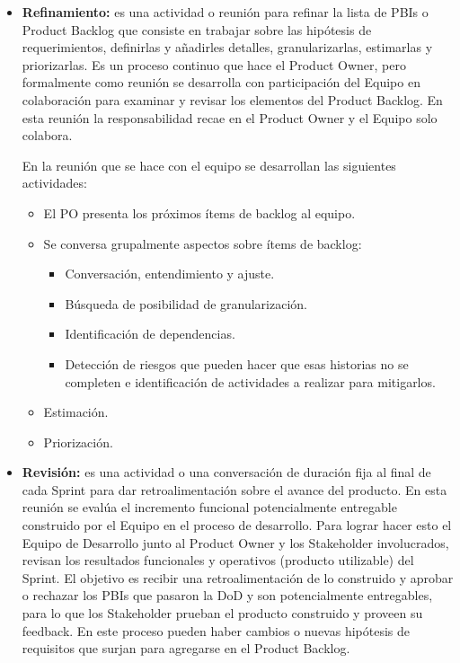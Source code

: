 \begin{itemize}
\item \textbf{Refinamiento:} es una actividad o reunión para refinar la lista de PBIs o Product Backlog que consiste en trabajar sobre las hipótesis de requerimientos, definirlas y añadirles detalles, granularizarlas, estimarlas y priorizarlas. Es un proceso continuo que hace el Product Owner, pero formalmente como reunión se desarrolla con participación del Equipo en colaboración para examinar y revisar los elementos del Product Backlog. En esta reunión la responsabilidad recae en el Product Owner y el Equipo solo colabora.

En la reunión que se hace con el equipo se desarrollan las siguientes actividades:
  \begin{itemize}
  \item{El PO presenta los próximos ítems de backlog al equipo.}
  \item{Se conversa grupalmente aspectos sobre ítems de backlog: }
    \begin{itemize}
    \item{Conversación, entendimiento y ajuste.}
    \item{Búsqueda de posibilidad de granularización.}
    \item{Identificación de dependencias.}
    \item{Detección de riesgos que pueden hacer que esas historias no se completen e identificación de actividades a realizar para mitigarlos.}
    \end{itemize}
  \item{Estimación.}
  \item{Priorización.}
  \end{itemize}

\item \textbf{Revisión:} es una actividad o una conversación de duración fija al final de cada Sprint para dar retroalimentación sobre el avance del producto. En esta reunión se evalúa el incremento funcional potencialmente entregable construido por el Equipo en el proceso de desarrollo. Para lograr hacer esto el Equipo de Desarrollo junto al Product Owner y los Stakeholder involucrados, revisan los resultados funcionales y operativos (producto utilizable) del Sprint. El objetivo es recibir una retroalimentación de lo construido y aprobar o rechazar los PBIs que pasaron la DoD y son potencialmente entregables, para lo que los Stakeholder prueban el producto construido y proveen su feedback. En este proceso pueden haber cambios o nuevas hipótesis de requisitos que surjan para agregarse en el Product Backlog.


\end{itemize}

